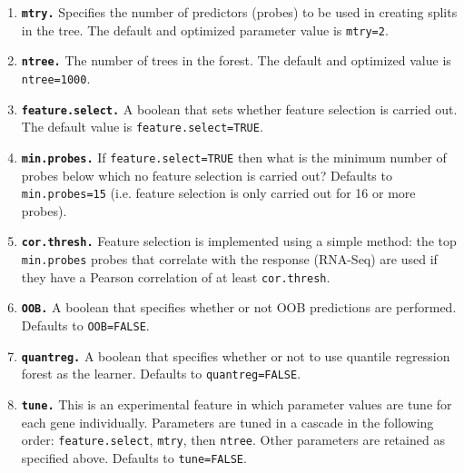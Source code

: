 \documentclass[a4paper,12pt]{article}
\begin{document}
\begin{enumerate}
\item \textbf{\texttt{mtry.}} Specifies the number of predictors (probes) to be used in creating splits in the tree. The default and optimized parameter value is \texttt{mtry=2}.
\item \textbf{\texttt{ntree.}} The number of trees in the forest. The default and optimized value is \texttt{ntree=1000}.
\item \textbf{\texttt{feature.select.}} A boolean that sets whether feature selection is carried out. The default value is \texttt{feature.select=TRUE}.
\item \textbf{\texttt{min.probes.}} If \texttt{feature.select=TRUE} then what is the minimum number of probes below which no feature selection is carried out? Defaults to \texttt{min.probes=15} (i.e. feature selection is only carried out for 16 or more probes).
\item \textbf{\texttt{cor.thresh.}} Feature selection is implemented using a simple method: the top \texttt{min.probes} probes that correlate with the response (RNA-Seq) are used if they have a Pearson correlation of at least \texttt{cor.thresh}.
\item \textbf{\texttt{OOB.}} A boolean that specifies whether or not OOB predictions are performed. Defaults to \texttt{OOB=FALSE}.
\item \textbf{\texttt{quantreg.}} A boolean that specifies whether or not to use quantile regression forest as the learner. Defaults to \texttt{quantreg=FALSE}.
\item \textbf{\texttt{tune.}} This is an experimental feature in which parameter values are tune for each gene individually. Parameters are tuned in a cascade in the following order: \texttt{feature.select}, \texttt{mtry}, then \texttt{ntree}. Other parameters are retained as specified above. Defaults to \texttt{tune=FALSE}.
\end{enumerate}
\end{document}
